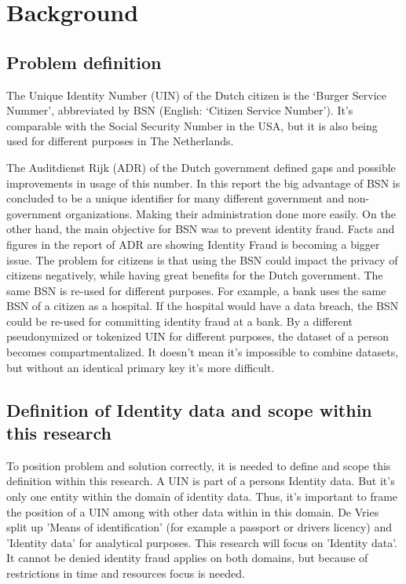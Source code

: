 \chapter{Background}\label{s:background}
\section{Problem definition}
The Unique Identity Number (UIN) of the Dutch citizen is the ‘Burger Service Nummer’, abbreviated by BSN (English: ‘Citizen Service Number’). It’s comparable with the Social Security Number in the USA, but it is also being used for different purposes in The Netherlands. \par
The Auditdienst Rijk (ADR)\cite{ADR} of the Dutch government defined gaps and possible improvements in usage of this number. In this report the big advantage of BSN is concluded to be a unique identifier for many different government and non-government organizations. Making their administration done more easily. On the other hand, the main objective for BSN was to prevent identity fraud. Facts and figures in the report of ADR are showing Identity Fraud is becoming a bigger issue. The problem for citizens is that using the BSN could impact the privacy of citizens negatively, while having great benefits for the Dutch government. The same BSN is re-used for different purposes. For example, a bank uses the same BSN of a citizen as a hospital. If the hospital would have a data breach, the BSN could be re-used for committing identity fraud at a bank. By a different pseudonymized or tokenized UIN for different purposes, the dataset of a person becomes compartmentalized. It doesn’t mean it’s impossible to combine datasets, but without an identical primary key it’s more difficult. 

\section{Definition of Identity data and scope within this research}
To position problem and solution correctly, it is needed to define and scope this definition within this research. A UIN is part of a persons Identity data. But it's only one entity within the domain of identity data. Thus, it's important to frame the position of a UIN among with other data within in this domain.
De Vries \etal \cite{Vries2007IdentiteitsfraudeEA} split up 'Means of identification' (for example a passport or drivers licency) and 'Identity data' for analytical purposes. This research will focus on 'Identity data'. It cannot be denied identity fraud applies on both domains, but because of restrictions in time and resources focus is needed. 
